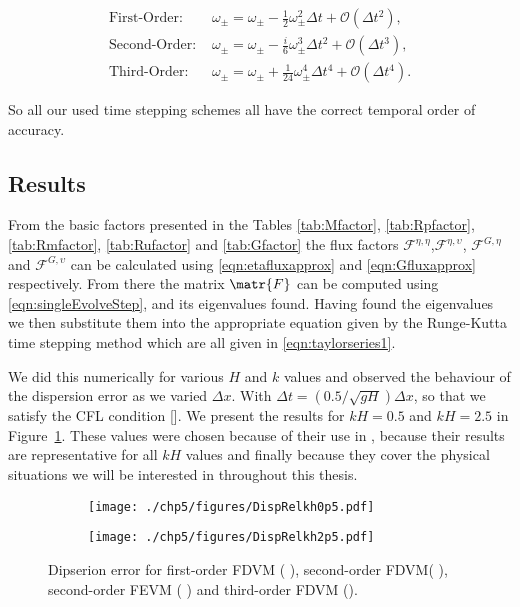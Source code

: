\begin{align*}
\text{First-Order:    }&\omega_\pm = \omega_\pm - \frac{1}{2}\omega_\pm^2 \Delta t + \mathcal{O}\left(\Delta t^2\right) ,\\
\text{Second-Order:    }&\omega_\pm = \omega_\pm - \frac{i}{6}\omega_\pm^3 \Delta t^2 + \mathcal{O}\left(\Delta t^3\right),\\
\text{Third-Order:    }&\omega_\pm = \omega_\pm + \frac{1}{24}\omega_\pm^4 \Delta t^4 + \mathcal{O}\left(\Delta t^4\right).
\end{align*}

So all our used time stepping schemes all have the correct temporal order of accuracy.

\subsection{Results}
From the basic factors presented in the Tables \ref{tab:Mfactor}, \ref{tab:Rpfactor}, \ref{tab:Rmfactor}, \ref{tab:Rufactor} and \ref{tab:Gfactor} the flux factors $\mathcal{F}^{\eta,\eta}$,$\mathcal{F}^{\eta,\upsilon}$, $\mathcal{F}^{G,\eta}$ and $\mathcal{F}^{G,\upsilon}$
can be calculated using \eqref{eqn:etafluxapprox} and \eqref{eqn:Gfluxapprox} respectively. From there the matrix $\matr{F}$ can be computed using \eqref{eqn:singleEvolveStep}, and its eigenvalues found. Having found the eigenvalues we then substitute them into the appropriate equation given by the Runge-Kutta time stepping method which are all given in \eqref{eqn:taylorseries1}. 

We did this numerically for various $H$ and $k$ values and observed the behaviour of the dispersion error as we varied $\Delta x$. With $\Delta t =   \left( 0.5 / \sqrt{gH} \right) {\Delta x} $, so that we satisfy the CFL condition []. We present the results for $kH = 0.5$ and $kH = 2.5$ in Figure~\ref{fig:DispErrMeth1}. These values were chosen because of their use in \cite{Filippini-etal-2016-381}, because their results are representative for all $kH$ values and finally because they cover the physical situations we will be interested in throughout this thesis.

\begin{figure}
	\centering
	\begin{subfigure}{0.5\textwidth}
		\texttt{[image: ./chp5/figures/DispRelkh0p5.pdf]}
	\end{subfigure}%
	\begin{subfigure}{0.5\textwidth}
		\texttt{[image: ./chp5/figures/DispRelkh2p5.pdf]}
	\end{subfigure}
	\caption{Dipserion error for first-order FDVM ({\color{green!60!black} \solidrule}), second-order FDVM({\color{red} \solidrule}), second-order FEVM ({\color{blue} \solidrule})  and third-order FDVM ({\solidrule}).}
	\label{fig:DispErrMeth1}
\end{figure}

